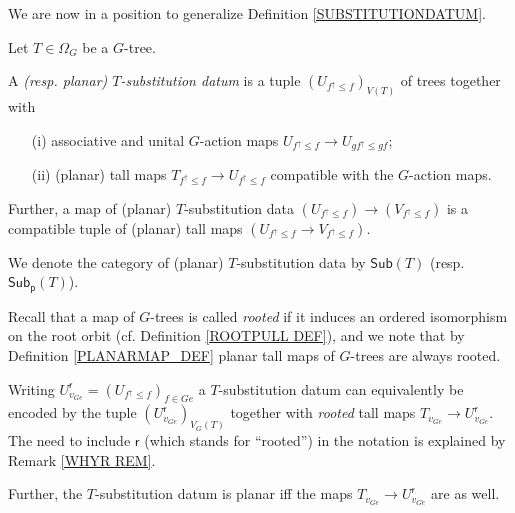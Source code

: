 \documentclass[a4paper,10pt]{article}%
\begin{document}
We are now in a position to generalize 
Definition \ref{SUBSTITUTIONDATUM}.

\begin{definition}\label{SUBSTITUTIONDATUMG DEF}
	Let $T \in \Omega_G$ be a $G$-tree.
	
	A \textit{(resp. planar) $T$-substitution datum} is a tuple 
	$\left(U_{f^{\uparrow} \leq f} \right)_{V(T)}$ of trees together with
\begin{itemize}	
\item[(i)] associative and unital $G$-action maps
$U_{f^{\uparrow} \leq f} \to U_{g f^{\uparrow} \leq g f}$; 
\item[(ii)]	(planar) tall maps 
	$T_{f^{\uparrow} \leq f} \to U_{f^{\uparrow} \leq f}$ compatible with the $G$-action maps.
\end{itemize}	
	Further, a map of (planar) $T$-substitution data 
	$\left(U_{f^{\uparrow} \leq f}\right) \to
	\left(V_{f^{\uparrow} \leq f}\right)$ is a compatible tuple of (planar) tall maps 
	$\left(U_{f^{\uparrow} \leq f} \to V_{f^{\uparrow} \leq f} \right)$.
	
	We denote the category of (planar) $T$-substitution data 
	by $\mathsf{Sub}(T)$
	(resp. $\mathsf{Sub}_{\mathsf{p}}(T)$).
\end{definition}


Recall that a map of $G$-trees is called 
\textit{rooted} if it induces an ordered isomorphism on the root orbit (cf. Definition \ref{ROOTPULL DEF}),
and we note that by Definition \ref{PLANARMAP_DEF} planar tall maps of $G$-trees are always rooted.

\begin{remark}\label{SUBSGREF DEF}
Writing $U^{\mathsf{r}}_{v_{G e}} = (U_{f^{\uparrow} \leq f})_{f \in Ge}$
a $T$-substitution datum can equivalently be encoded by the tuple
$\left(U^{\mathsf{r}}_{v_{G e}}\right)_{V_G(T)}$ together with \textit{rooted} tall maps 
$T_{v_{Ge}} \to U^{\mathsf{r}}_{v_{G e}}$.
The need to include $\mathsf{r}$ (which stands for ``rooted'')
in the notation is explained by Remark \ref{WHYR REM}.

Further, the $T$-substitution datum is planar iff the maps $T_{v_{Ge}} \to U^{\mathsf{r}}_{v_{G e}}$ are as well.
\end{remark}
\end{document}
